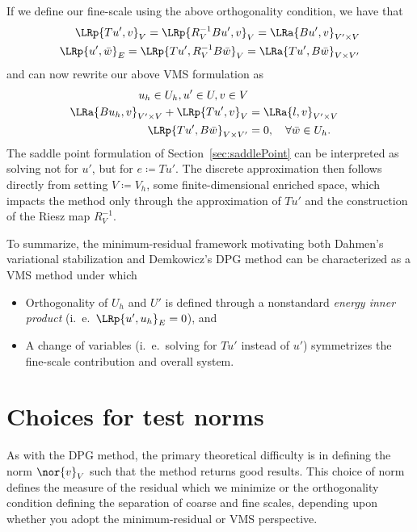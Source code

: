 If we define our fine-scale using the above orthogonality condition, we have that
\begin{align*}
\LRp{Tu',v}_V = \LRp{R_V^{-1}Bu',v}_V = \LRa{Bu',v}_{V'\times V}\\
\LRp{u',\bar{w}}_E = \LRp{Tu',R_V^{-1}B\bar{w}}_V = \LRa{Tu',B\bar{w}}_{V\times V'}
\end{align*}
and can now rewrite our above VMS formulation as 
\begin{align*}
u_h \in U_h, u' \in U, v \in V\\
\LRa{Bu_h,v}_{V'\times V} + \LRp{Tu',v}_{V} &= \LRa{l,v}_{V'\times V}\\
\LRp{Tu',B\bar{w}}_{V\times V'} &= 0, \quad \forall \bar{w} \in U_h.
\end{align*}
The saddle point formulation of Section~\ref{sec:saddlePoint} can be interpreted as solving not for $u'$, but for $e\coloneqq Tu'$.  The discrete approximation then follows directly from setting $V \coloneqq V_h$, some finite-dimensional enriched space, which impacts the method only through the approximation of $Tu'$ and the construction of the Riesz map $R_V^{-1}$.  

To summarize, the minimum-residual framework motivating both Dahmen's variational stabilization and Demkowicz's DPG method can be characterized as a VMS method under which 
\begin{itemize}
\item Orthogonality of $U_h$ and $U'$ is defined through a nonstandard \textit{energy inner product} (i.\ e.\ $\LRp{u',u_h}_E = 0$), and
\item A change of variables (i.\ e.\ solving for $Tu'$ instead of $u'$) symmetrizes the fine-scale contribution and overall system.
\end{itemize}

\section{Choices for test norms}

As with the DPG method, the primary theoretical difficulty is in defining the norm $\nor{v}_V$ such that the method returns good results.  This choice of norm defines the measure of the residual which we minimize or the orthogonality condition defining the separation of coarse and fine scales, depending upon whether you adopt the minimum-residual or VMS perspective.  

